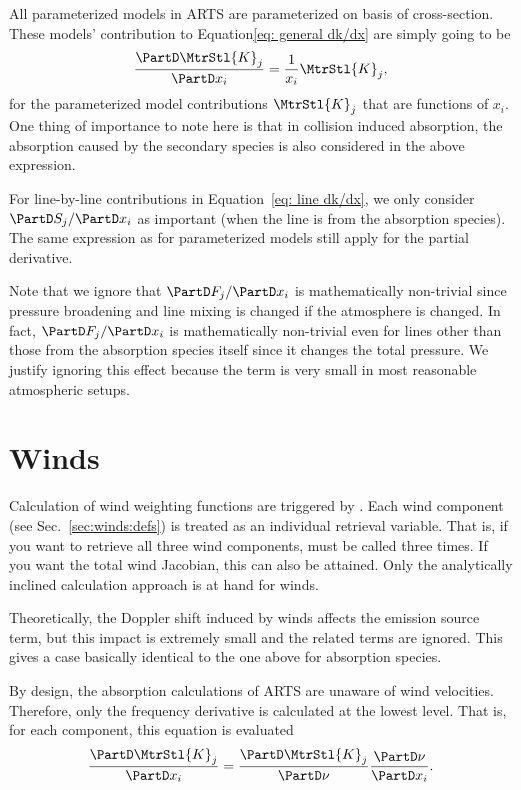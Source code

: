 All parameterized models in ARTS are parameterized on basis of cross-section.
These models' contribution to Equation\ref{eq: general dk/dx} are simply going to be
\begin{equation}
 \frac{\PartD \MtrStl{K}_j}{\PartD x_i}=\frac{1}{x_i} \MtrStl{K}_j,
\end{equation}
for the parameterized model contributions $\MtrStl{K}_j$ that are functions of $x_i$.
One thing of importance to note here is that in collision induced absorption, the 
absorption caused by the secondary species is also considered in the above expression.
 
For line-by-line contributions in Equation~\ref{eq: line dk/dx},
we only consider $\PartD S_j/\PartD x_i$ as important (when the line is from the absorption species).
The same expression as for parameterized models still apply for the partial derivative.

Note that we ignore that $\PartD F_j/\PartD x_i$ is mathematically non-trivial since pressure broadening 
and line mixing is changed if the atmosphere is changed.  In fact, $\PartD F_j/\PartD x_i$ is 
mathematically non-trivial even for lines other than those from the absorption species itself
since it changes the total pressure.  We justify ignoring this effect because the term is very 
small in most reasonable atmospheric setups.

\section{Winds}
\label{sec:wfuns:winds}
%
Calculation of wind weighting functions are triggered by
. Each wind component (see Sec.~\ref{sec:winds:defs})
is treated as an individual retrieval variable. That is, if you want to
retrieve all three wind components,  must be called
three times. If you want the total wind Jacobian, this can also be attained.
Only the analytically inclined calculation approach is at hand for winds.

Theoretically, the Doppler shift induced by winds affects the emission source
term, but this impact is extremely small
and the related terms are ignored. This gives a case basically identical to the
one above for absorption species.

By design, the absorption calculations of ARTS are unaware of wind velocities.  
Therefore, only the frequency derivative is calculated at the lowest level.  That is,
for each component, this equation is evaluated
\begin{equation}
   \frac{\PartD \MtrStl{K}_j}{\PartD x_i}=\frac{\PartD \MtrStl{K}_j}{\PartD \nu} \frac{\PartD \nu}{\PartD x_i}.
\end{equation}

